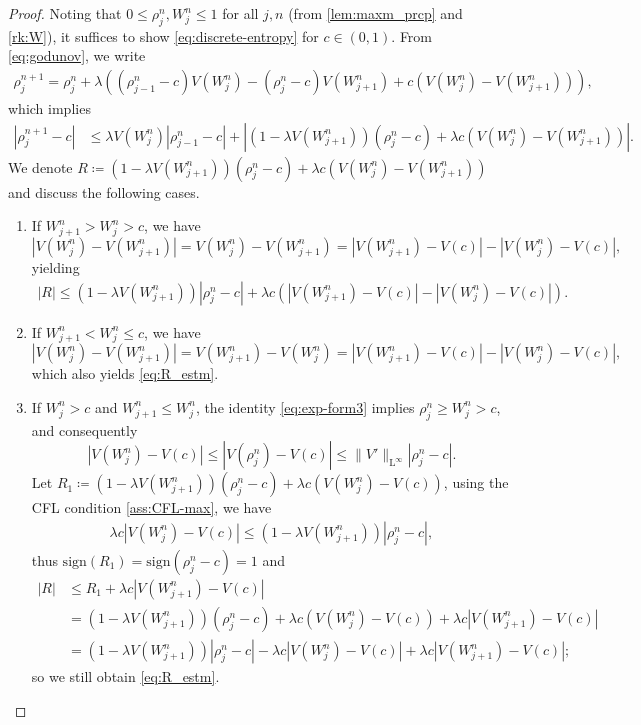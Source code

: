 \documentclass[10pt]{amsart}
\theoremstyle{plain}
\theoremstyle{definition}
\numberwithin{equation}{section}
\newcommand{\sgn}[1]{\mathrm{sign}\left(#1\right)}
\begin{document}
\begin{proof}
Noting that $0\leq\rho_j^n,W_j^n\leq1$ for all $j,n$ (from \cref{lem:maxm_prcp} and \cref{rk:W}), it suffices to show \cref{eq:discrete-entropy} for $c\in(0,1)$.
From \cref{eq:godunov}, we write
\begin{align*}
\rho_j^{n+1} = \rho_j^n+\lambda \left( (\rho_{j-1}^n-c) V(W_j^n) - (\rho_j^n-c) V(W_{j+1}^n) + c \left(V(W_j^n)-V(W_{j+1}^n)\right) \right),
\end{align*}
which implies
\begin{align*}
|\rho_j^{n+1}-c| &\leq \lambda V(W_j^n) |\rho_{j-1}^n-c|  + \left| \left(1-\lambda V(W_{j+1}^n)\right) (\rho_j^n-c)  + \lambda c \left(V(W_j^n)-V(W_{j+1}^n)\right) \right|.
\end{align*}
We denote $R\coloneqq (1-\lambda V(W_{j+1}^n)) (\rho_j^n-c)  + \lambda c (V(W_j^n)-V(W_{j+1}^n))$ and discuss the following cases. 

\begin{enumerate}[label={\uline{Case \arabic*.}}]
    \item \label{it:c1} If 
$W_{j+1}^n>W_j^n>c$, we have
\[ \left|V(W_j^n)-V(W_{j+1}^n)\right| = V(W_j^n)-V(W_{j+1}^n) = \left|V(W_{j+1}^n)-V(c)\right| - \left|V(W_j^n)-V(c)\right|, \]
yielding
\begin{align}\label{eq:R_estm}
    |R| \leq \left(1-\lambda V(W_{j+1}^n)\right) |\rho_j^n-c| + \lambda c \left(\left|V(W_{j+1}^n)-V(c)\right| - \left|V(W_j^n)-V(c)\right|\right).
\end{align}
\item \label{it:c2} If $W_{j+1}^n<W_j^n \leq c$, we have
\[ \left|V(W_j^n)-V(W_{j+1}^n)\right| = V(W_{j+1}^n) - V(W_j^n) = \left|V(W_{j+1}^n)-V(c)\right| - \left|V(W_j^n)-V(c)\right|, \]
which also yields \cref{eq:R_estm}. 
\item \label{it:c3} If $W_j^n>c$ and $W_{j+1}^n\leq W_j^n$,  the identity \cref{eq:exp-form3} implies $\rho_j^n\geq W_j^n>c$, and consequently
\[ \left|V(W_j^n)-V(c)\right| \leq \left|V(\rho_j^n)-V(c)\right| \leq \|V'\|_{\mathrm{L}^\infty} |\rho_j^n-c|. \]
Let $R_1\coloneqq \left(1-\lambda V(W_{j+1}^n)\right) (\rho_j^n-c)  + \lambda c \left(V(W_j^n)-V(c)\right)$, using the CFL condition \cref{ass:CFL-max}, we have
\begin{align*}
    \lambda c\left|V(W_j^n)-V(c)\right| \leq \left(1-\lambda V(W_{j+1}^n)\right) |\rho_j^n-c|,
\end{align*}
thus $\sgn{R_1}=\sgn{\rho_j^n-c}=1$ and
\begin{align*}
    |R| &\leq R_1  + \lambda c \left|V(W_{j+1}^n)-V(c)\right| \\
    &= \left(1-\lambda V(W_{j+1}^n)\right) (\rho_j^n-c)  + \lambda c \left(V(W_j^n)-V(c)\right) + \lambda c \left|V(W_{j+1}^n)-V(c)\right| \\
    &= \left(1-\lambda V(W_{j+1}^n)\right) |\rho_j^n-c| - \lambda c \left|V(W_j^n)-V(c)\right| + \lambda c \left|V(W_{j+1}^n)-V(c)\right|; 
\end{align*}
so we still obtain \cref{eq:R_estm}.


\end{enumerate}
\end{proof}
\end{document}
